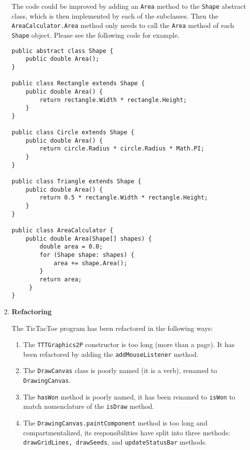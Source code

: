 \documentclass{report}
\begin{document}
\begin{enumerate}
	The code could be improved by adding an \texttt{Area} method to the
	\texttt{Shape} abstract class, which is then implemented by each of the
	subclasses. Then the \texttt{AreaCalculator.Area} method only needs to
	call the \texttt{Area} method of each \texttt{Shape} object. Please see
	the following code for example.
	
	\begin{verbatim}
public abstract class Shape {
    public double Area();
}
    
public class Rectangle extends Shape {
    public double Area() {
        return rectangle.Width * rectangle.Height;
    }
}
    
public class Circle extends Shape {
    public double Area() {
        return circle.Radius * circle.Radius * Math.PI;
    }
}
    
public class Triangle extends Shape {
    public double Area() {
        return 0.5 * rectangle.Width * rectangle.Height;
    }
}

public class AreaCalculator {
    public double Area(Shape[] shapes) {
        double area = 0.0;
        for (Shape shape: shapes) {
            area += shape.Area();
        }
        return area;
     }
}
	\end{verbatim}

	\item \textbf{Refactoring}

    The TicTacToe program has been refactored in the following ways:
    
    \begin{enumerate}
\item The \texttt{TTTGraphics2P} constructor is too long (more than a page). It has been 
refactored by adding the \texttt{addMouseListener} method.
 
\item The \texttt{DrawCanvas} class is poorly named (it is a verb), renamed to
\texttt{DrawingCanvas}.
 
\item The \texttt{hasWon} method is poorly named, it has been renamed to \texttt{isWon}
to match nomenclature of the \texttt{isDraw} method.
 
\item The \texttt{DrawingCanvas.paintComponent} method is too long and compartmentalized,
its responsibilities have split into three methods: \texttt{drawGridLines, drawSeeds}, and
\texttt{updateStatusBar} methods.
 

\end{enumerate}
\end{enumerate}
\end{document}
